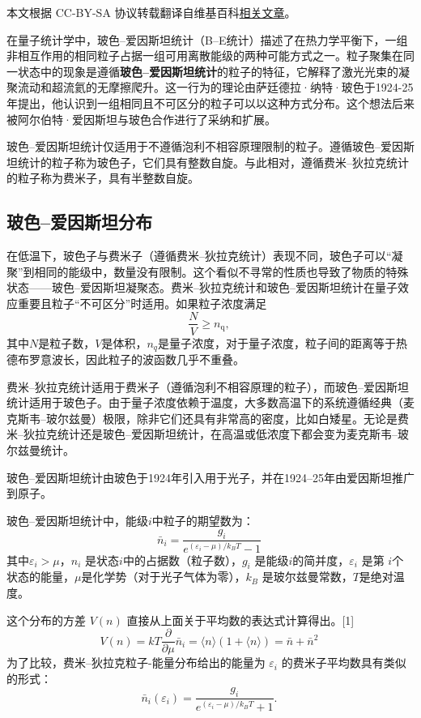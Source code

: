 
本文根据 CC-BY-SA 协议转载翻译自维基百科\href{https://en.wikipedia.org/wiki/Bose\%E2\%80\%93Einstein_statistics}{相关文章}。

在量子统计学中，玻色–爱因斯坦统计（B–E统计）描述了在热力学平衡下，一组非相互作用的相同粒子占据一组可用离散能级的两种可能方式之一。粒子聚集在同一状态中的现象是遵循\textbf{玻色–爱因斯坦统计}的粒子的特征，它解释了激光光束的凝聚流动和超流氦的无摩擦爬升。这一行为的理论由萨廷德拉·纳特·玻色于1924-25年提出，他认识到一组相同且不可区分的粒子可以以这种方式分布。这个想法后来被阿尔伯特·爱因斯坦与玻色合作进行了采纳和扩展。

玻色–爱因斯坦统计仅适用于不遵循泡利不相容原理限制的粒子。遵循玻色–爱因斯坦统计的粒子称为玻色子，它们具有整数自旋。与此相对，遵循费米–狄拉克统计的粒子称为费米子，具有半整数自旋。
\subsection{玻色–爱因斯坦分布}  

在低温下，玻色子与费米子（遵循费米–狄拉克统计）表现不同，玻色子可以“凝聚”到相同的能级中，数量没有限制。这个看似不寻常的性质也导致了物质的特殊状态——玻色–爱因斯坦凝聚态。费米–狄拉克统计和玻色–爱因斯坦统计在量子效应重要且粒子“不可区分”时适用。如果粒子浓度满足
\[
\frac{N}{V} \geq n_{\text{q}},~
\]
其中\( N \)是粒子数，\( V \)是体积，\( n_q \)是量子浓度，对于量子浓度，粒子间的距离等于热德布罗意波长，因此粒子的波函数几乎不重叠。

费米–狄拉克统计适用于费米子（遵循泡利不相容原理的粒子），而玻色–爱因斯坦统计适用于玻色子。由于量子浓度依赖于温度，大多数高温下的系统遵循经典（麦克斯韦–玻尔兹曼）极限，除非它们还具有非常高的密度，比如白矮星。无论是费米–狄拉克统计还是玻色–爱因斯坦统计，在高温或低浓度下都会变为麦克斯韦–玻尔兹曼统计。

玻色–爱因斯坦统计由玻色于1924年引入用于光子，并在1924–25年由爱因斯坦推广到原子。

玻色–爱因斯坦统计中，能级\( i \)中粒子的期望数为：
\[
\bar{n}_i = \frac{g_i}{e^{(\varepsilon_i - \mu) / k_B T} - 1}~
\]
其中\( \varepsilon_i > \mu \)，\( n_i \) 是状态\( i \)中的占据数（粒子数），\( g_i \) 是能级\( i \)的简并度，\( \varepsilon_i \) 是第 \( i \)个状态的能量，\( \mu \)是化学势（对于光子气体为零），\( k_B \) 是玻尔兹曼常数，\( T \)是绝对温度。

这个分布的方差 \( V(n) \) 直接从上面关于平均数的表达式计算得出。[1]
\[
V(n) = kT \frac{\partial}{\partial \mu} \bar{n}_i = \langle n \rangle (1 + \langle n \rangle) = \bar{n} + \bar{n}^2~
\]
为了比较，费米–狄拉克粒子-能量分布给出的能量为 \( \varepsilon_i \) 的费米子平均数具有类似的形式：
\[
\bar{n}_i(\varepsilon_i) = \frac{g_i}{e^{(\varepsilon_i - \mu) / k_B T} + 1}.~
\]